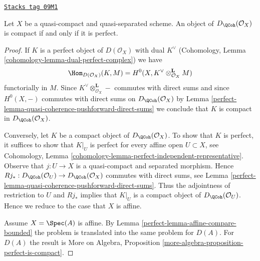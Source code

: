 \begin{proposition}
\label{perfect-proposition-compact-is-perfect}
\href{https://stacks.math.columbia.edu/tag/09M1}{\texttt{Stacks tag 09M1}}

Let $X$ be a quasi-compact and quasi-separated scheme.
An object of $D_\QCoh(\mathcal{O}_X)$ is compact
if and only if it is perfect.
\end{proposition}

\begin{proof}

If $K$ is a perfect object of $D(\mathcal{O}_X)$ with dual
$K^\vee$ (Cohomology, Lemma \ref{cohomology-lemma-dual-perfect-complex})
we have
$$
\Hom_{D(\mathcal{O}_X)}(K, M) =
H^0(X, K^\vee \otimes_{\mathcal{O}_X}^\mathbf{L} M)
$$
functorially in $M$. Since $K^\vee \otimes_{\mathcal{O}_X}^\mathbf{L} -$
commutes with direct sums and since $H^0(X, -)$ commutes with direct
sums on $D_\QCoh(\mathcal{O}_X)$ by
Lemma \ref{perfect-lemma-quasi-coherence-pushforward-direct-sums}
we conclude that $K$ is compact in $D_\QCoh(\mathcal{O}_X)$.

\medskip\noindent
Conversely, let $K$ be a compact object of $D_\QCoh(\mathcal{O}_X)$.
To show that $K$ is perfect, it suffices to show that
$K|_U$ is perfect for every affine open $U \subset X$, see
Cohomology, Lemma \ref{cohomology-lemma-perfect-independent-representative}.
Observe that $j : U \to X$ is a quasi-compact and separated morphism.
Hence
$Rj_* : D_\QCoh(\mathcal{O}_U) \to D_\QCoh(\mathcal{O}_X)$
commutes with direct sums, see
Lemma \ref{perfect-lemma-quasi-coherence-pushforward-direct-sums}.
Thus the adjointness of restriction to $U$ and $Rj_*$ implies that
$K|_U$ is a compact object of $D_\QCoh(\mathcal{O}_U)$.
Hence we reduce to the case that $X$ is affine.

\medskip\noindent
Assume $X = \Spec(A)$ is affine. By Lemma \ref{perfect-lemma-affine-compare-bounded}
the problem is translated into the same problem for $D(A)$.
For $D(A)$ the result is
More on Algebra, Proposition \ref{more-algebra-proposition-perfect-is-compact}.
\end{proof}

